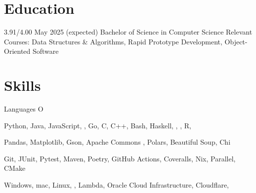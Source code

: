 \section{Education}
\begin{doutline}
      3.91/4.00
    \hfill May 2025 (expected)
        \2 Bachelor of Science in Computer Science
        \2 Relevant Courses: Data Structures \& Algorithms, Rapid Prototype Development, Object-Oriented Software
\end{doutline}

\section{Skills}
\begin{labeling}{Languages O}
    \item [Languages] Python, Java, JavaScript, , Go, C, C++, Bash, Haskell, , , R, \textsmaller{\LaTeX}
    \item [Libraries] Pandas, Matplotlib, Gson, Apache Commons , Polars, Beautiful Soup, Chi
    \item [Tools] Git, JUnit, Pytest, Maven, Poetry, GitHub Actions, Coveralls, Nix,  Parallel, CMake
    \item [Platforms] Windows, mac, Linux, ,  Lambda, Oracle Cloud Infrastructure, Cloudflare, 
\end{labeling}

